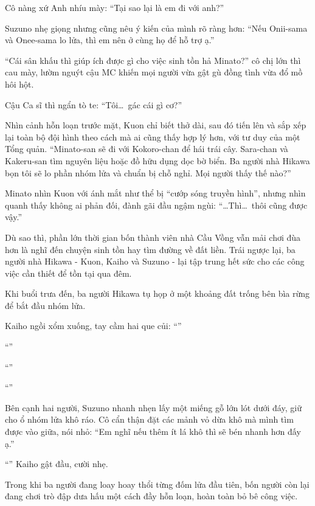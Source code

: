 \documentclass[../main.tex]{subfiles}
\begin{document}
Cô nàng xứ Anh nhíu mày: ``Tại sao lại là em đi với anh?''

Suzuno nhẹ giọng nhưng cũng nêu ý kiến của mình rõ ràng hơn: ``Nếu Onii-sama và Onee-sama lo lửa, thì em nên ở cùng họ để hỗ trợ ạ.''

``Cái sân khấu thì giúp ích được gì cho việc sinh tồn hả Minato?'' cô chị lớn thì cau mày, lườm nguýt cậu MC khiến mọi người vừa gật gù đồng tình vừa đổ mồ hôi hột.

Cậu Ca sĩ thì ngẩn tò te: ``Tôi\dots\ gác cái gì cơ?''

Nhìn cảnh hỗn loạn trước mặt, Kuon chỉ biết thở dài, sau đó tiến lên và sắp xếp lại toàn bộ đội hình theo cách mà ai cũng thấy hợp lý hơn, với tư duy của một Tổng quản. ``Minato-san sẽ đi với Kokoro-chan để hái trái cây. Sara-chan và Kakeru-san tìm nguyên liệu hoặc đồ hữu dụng dọc bờ biển. Ba người nhà Hikawa bọn tôi sẽ lo phần nhóm lửa và chuẩn bị chỗ nghỉ. Mọi người thấy thế nào?''

Minato nhìn Kuon với ánh mắt như thể bị ``cướp sóng truyền hình'', nhưng nhìn quanh thấy không ai phản đối, đành gãi đầu ngậm ngùi: ``\dots Thì\dots\ thôi cũng được vậy.''

Dù sao thì, phần lớn thời gian bốn thành viên nhà Cầu Vồng vẫn mải chơi đùa hơn là nghĩ đến chuyện sinh tồn hay tìm đường về đất liền. Trái ngược lại, ba người nhà Hikawa - Kuon, Kaiho và Suzuno - lại tập trung hết sức cho các công việc cần thiết để tồn tại qua đêm.

\ct

Khi buổi trưa đến, ba người Hikawa tụ họp ở một khoảng đất trống bên bìa rừng để bắt đầu nhóm lửa.

Kaiho ngồi xổm xuống, tay cầm hai que củi: ``''

``''

``''

``''

Bên cạnh hai người, Suzuno nhanh nhẹn lấy một miếng gỗ lớn lót dưới đáy, giữ cho ổ nhóm lửa khô ráo. Cô cẩn thận đặt các mảnh vỏ dừa khô mà mình tìm được vào giữa, nói nhỏ: ``Em nghĩ nếu thêm ít lá khô thì sẽ bén nhanh hơn đấy ạ.''

``'' Kaiho gật đầu, cười nhẹ.

Trong khi ba người đang loay hoay thổi từng đốm lửa đầu tiên, bốn người còn lại đang chơi trò đập dưa hấu một cách đầy hỗn loạn, hoàn toàn bỏ bê công việc.
\end{document}
